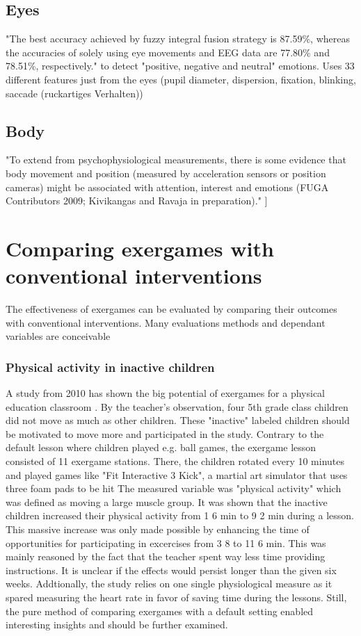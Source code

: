\subsection{Eyes}
"The best accuracy achieved by fuzzy integral fusion strategy is 87.59\%, whereas the accuracies of solely using eye movements and EEG data are 77.80\% and 78.51\%, respectively." to detect "positive, negative and neutral" emotions. Uses 33 different features just from the eyes (pupil diameter, dispersion, fixation, blinking, saccade (ruckartiges Verhalten))\cite{lu15combining}

\subsection{Body}
"To extend from psychophysiological measurements, there is some evidence that body movement and position (measured by acceleration sensors or position cameras) might be associated with
attention, interest and emotions (FUGA Contributors 2009; Kivikangas and
Ravaja in preparation)." \cite{kivikangas2011review}
]
\section{Comparing exergames with conventional interventions}

The effectiveness of exergames can be evaluated by comparing their outcomes with conventional interventions. Many evaluations methods and dependant variables are conceivable 

\subsubsection{Physical activity in inactive children}
A study from 2010 has shown the big potential of exergames for a physical education classroom \cite{fogel2010effects}. By the teacher's observation, four 5th grade class children did not move as much as other children. These "inactive" labeled children should be motivated to move more and participated in the study. 
Contrary to the default lesson where children played e.g. ball games, the exergame lesson consisted of 11 exergame stations. There, the children rotated every 10 minutes and played games like "Fit Interactive 3 Kick", a martial art simulator that uses three foam pads to be hit 
The measured variable was "physical activity" which was defined as moving a large muscle group. It was shown that the inactive children increased their physical activity from 1 6 min to 9 2 min during a lesson. This massive increase was only made possible by enhancing the time of opportunities for participating in excercises from 3 8 to 11 6 min. This was mainly reasoned by the fact that the teacher spent way less time providing instructions. 
It is unclear if the effects would persist longer than the given six weeks. Addtionally, the study relies on one single physiological measure as it spared measuring the heart rate in favor of saving time during the lessons. Still, the pure method of comparing exergames with a default setting enabled interesting insights and should be further examined.

